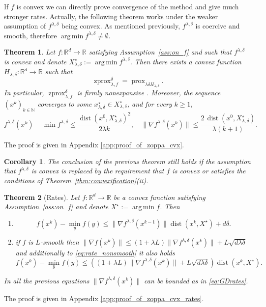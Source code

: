\documentclass{article}
\newtheorem{theorem}{Theorem}
\newtheorem{corollary}{Corollary}
\newcommand{\prox}{\ensuremath{\operatorname{prox}}}
\newcommand{\zprox}{\ensuremath{\operatorname{zprox}}}
\newcommand{\dist}{\ensuremath{\operatorname{dist}}}
\DeclareMathOperator*{\argmin}{arg\,min}
\begin{document}
If $f$ is convex we can directly prove convergence of the method and give much stronger rates. Actually, the following theorem works under the weaker assumption of $f^{\lambda,\delta}$ being convex. As mentioned previously, $f^{\lambda,\delta}$ is coercive and smooth, therefore $\argmin f^{\lambda,\delta} \neq \emptyset$. 

\begin{theorem}\label{thm:zoppa_cvx}
Let $f:\mathbb{R}^d\to\mathbb{R}$ satisfying Assumption~\ref{ass:on_f} and such that $f^{\lambda,\delta}$ is convex and denote $X_{\lambda,\delta}^{\star}:=\argmin f^{\lambda,\delta}$. Then there exists a convex function $H_{\lambda,\delta}:\mathbb{R}^d\to\mathbb{R}$ such that
\[
\zprox_{\lambda, f}^{\delta}=\prox_{\lambda\delta H_{\lambda,\delta}}.
\]
In particular, $\zprox_{\lambda, f}^{\delta}$ is firmly nonexpansive \cite{combettes2005signal}. Moreover, the sequence $(x^k)_{k\in\mathbb{N}}$ converges to some $x^\star_{\lambda,\delta}\in X_{\lambda,\delta}^{\star}$, and for every $k\ge1$,
\begin{equation}\label{eq:GDrates}
    f^{\lambda,\delta}(x^k)-\min f^{\lambda,\delta}
\le
\frac{\dist(x^0,X_{\lambda,\delta}^{\star})^2}{2\lambda k}, \quad \|\nabla f^{\lambda,\delta}(x^k)\|
\le
\frac{2\,\dist(x^0,X_{\lambda,\delta}^{\star})}{\lambda(k+1)}.
\end{equation}
\end{theorem}
        The proof is given in Appendix \ref{app:proof_of_zoppa_cvx}.

\begin{corollary}
The conclusion of the previous theorem still holds if the assumption that $f^{\lambda,\delta}$ is convex is replaced by the requirement that $f$ is convex or satisfies the conditions of Theorem~\ref{thm:convexification}(ii).
\end{corollary}

\begin{theorem}[Rates]\label{thm:zoppa_cvx_rates}
Let $f:\mathbb{R}^d\to\mathbb{R}$ be a convex function satisfying Assumption~\ref{ass:on_f} and denote $X^{\star}:=\argmin f$. Then \begin{enumerate}
    \item[(i)] \begin{equation}\label{eq:rate_nonsmooth}
        f(x^{k})-\min_y f(y)\leq \|\nabla f^{\lambda,\delta}(x^{k-1})\|\operatorname{dist}(x^{k},X^\star)+ d \delta.
    \end{equation}
    \item[(ii)] if $f$ is $L$-smooth then
    \(\|\nabla f(x^k)\| \leq (1+\lambda L) \|\nabla f^{\lambda, \delta}(x^k)\|+ L \sqrt{d \lambda \delta}\)
    and additionally to \eqref{eq:rate_nonsmooth} it also holds
    \[f(x^k) - \min_y f(y) \leq \left((1+\lambda L) \|\nabla f^{\lambda, \delta}(x^k)\|+ L \sqrt{d \lambda \delta}\right)\dist(x^k,X^\star).\]
\end{enumerate}
In all the previous equations $\|\nabla f^{\lambda,\delta}(x^k)\|$ can be bounded as in \eqref{eq:GDrates}.
\end{theorem}
    The proof is given in Appendix \ref{app:proof_of_zoppa_cvx_rates}.
\end{document}
